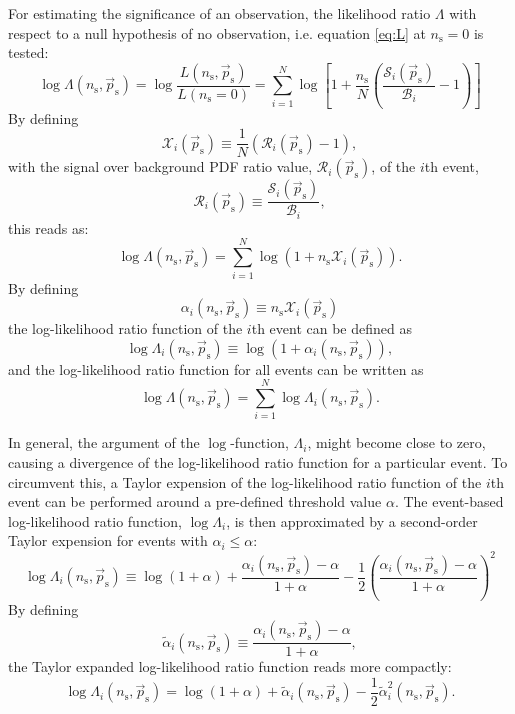 \documentclass{article}
\newcommand{\ns}{n_{\mathrm{s}}}
\newcommand{\ps}{\vec{p}_{\mathrm{s}}}
\begin{document}
For estimating the significance of an observation, the likelihood ratio
$\Lambda$ with respect to a null hypothesis of no observation, i.e.
equation \ref{eq:L} at $\ns=0$ is tested:
\begin{equation}
 \log \Lambda(\ns,\ps) = \log \frac{L(\ns,\ps)}{L(\ns=0)} = \sum_{i=1}^{N} \log \left[ 1 + \frac{\ns}{N}\left( \frac{\mathcal{S}_i(\ps)}{\mathcal{B}_i} - 1 \right) \right]
\label{eq:logLambda}
\end{equation}
By defining
\begin{equation}
\mathcal{X}_i(\ps) \equiv \frac{1}{N}\left( \mathcal{R}_i(\ps) - 1 \right),
\label{eq:Xi}
\end{equation}
with the signal over background PDF ratio value, $\mathcal{R}_{i}(\ps)$, of the
$i$th event,
\begin{equation}
 \mathcal{R}_i(\ps) \equiv \frac{\mathcal{S}_i(\ps)}{\mathcal{B}_i},
\end{equation}
this reads as:
\begin{equation}
 \log \Lambda(\ns,\ps) = \sum_{i=1}^{N} \log (1 + \ns\mathcal{X}_i(\ps)).
 \label{eq:logLambdaOfX}
\end{equation}
By defining
\begin{equation}
 \alpha_i(\ns,\ps) \equiv \ns \mathcal{X}_i(\ps)
\end{equation}
the log-likelihood ratio function of the $i$th event can be defined as
\begin{equation}
 \log \Lambda_i(\ns,\ps) \equiv \log(1 + \alpha_i(\ns, \ps)),
 \label{eq:logLambdaiOfalphai}
\end{equation}
and the log-likelihood ratio function for all events can be written as
\begin{equation}
 \log \Lambda(\ns,\ps) = \sum_{i=1}^{N} \log \Lambda_i(\ns,\ps).
 \label{eq:logLambdaOflogLambdai}
\end{equation}

In general, the argument of the $\log$-function, $\Lambda_i$, might become close
to zero, causing a divergence of the log-likelihood ratio function for a particular event.
To circumvent this, a Taylor expension of the
log-likelihood ratio function of the $i$th event can be performed around a
pre-defined threshold value $\alpha$.
The event-based log-likelihood ratio function, $\log \Lambda_i$, is then
approximated by a second-order Taylor expension for events with $\alpha_i \leq \alpha$:
\begin{equation}
 \log\Lambda_i(\ns,\ps) \equiv \log(1 + \alpha) + \frac{\alpha_i(\ns,\ps) - \alpha}{1 + \alpha} - \frac{1}{2} \left(\frac{\alpha_i(\ns,\ps) - \alpha}{1 + \alpha}\right)^2
 \label{eq:logLambdaiTaylor}
\end{equation}
By defining
\begin{equation}
 \tilde{\alpha}_i(\ns,\ps) \equiv \frac{\alpha_i(\ns,\ps) - \alpha}{1 + \alpha},
\end{equation}
the Taylor expanded log-likelihood ratio function reads more compactly:
\begin{equation}
 \log\Lambda_i(\ns,\ps) = \log(1 + \alpha) + \tilde{\alpha}_i(\ns,\ps) - \frac{1}{2} \tilde{\alpha}_i^2(\ns,\ps).
 \label{eq:logLambdaiTaylorOfTildeAlpha}
\end{equation}
\end{document}
